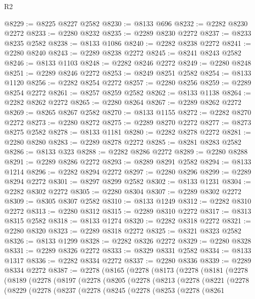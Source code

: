 \begin{lexlean}{R2}
\begin{coremodule}
@8229 := @8225 @8227 @2582
@8230 := @8133 @696
@8232 := @2282 @8230 @2272
@8233 := @2280 @8232
@8235 := @2289 @8230 @2272
@8237 := @8233 @8235 @2582
@8238 := @8133 @1086
@8240 := @2282 @8238 @2272
@8241 := @2280 @8240
@8243 := @2289 @8238 @2272
@8245 := @8241 @8243 @2582
@8246 := @8133 @1103
@8248 := @2282 @8246 @2272
@8249 := @2280 @8248
@8251 := @2289 @8246 @2272
@8253 := @8249 @8251 @2582
@8254 := @8133 @1120
@8256 := @2282 @8254 @2272
@8257 := @2280 @8256
@8259 := @2289 @8254 @2272
@8261 := @8257 @8259 @2582
@8262 := @8133 @1138
@8264 := @2282 @8262 @2272
@8265 := @2280 @8264
@8267 := @2289 @8262 @2272
@8269 := @8265 @8267 @2582
@8270 := @8133 @1155
@8272 := @2282 @8270 @2272
@8273 := @2280 @8272
@8275 := @2289 @8270 @2272
@8277 := @8273 @8275 @2582
@8278 := @8133 @1181
@8280 := @2282 @8278 @2272
@8281 := @2280 @8280
@8283 := @2289 @8278 @2272
@8285 := @8281 @8283 @2582
@8286 := @8133 @323
@8288 := @2282 @8286 @2272
@8289 := @2280 @8288
@8291 := @2289 @8286 @2272
@8293 := @8289 @8291 @2582
@8294 := @8133 @1214
@8296 := @2282 @8294 @2272
@8297 := @2280 @8296
@8299 := @2289 @8294 @2272
@8301 := @8297 @8299 @2582
@8302 := @8133 @1231
@8304 := @2282 @8302 @2272
@8305 := @2280 @8304
@8307 := @2289 @8302 @2272
@8309 := @8305 @8307 @2582
@8310 := @8133 @1249
@8312 := @2282 @8310 @2272
@8313 := @2280 @8312
@8315 := @2289 @8310 @2272
@8317 := @8313 @8315 @2582
@8318 := @8133 @1274
@8320 := @2282 @8318 @2272
@8321 := @2280 @8320
@8323 := @2289 @8318 @2272
@8325 := @8321 @8323 @2582
@8326 := @8133 @1299
@8328 := @2282 @8326 @2272
@8329 := @2280 @8328
@8331 := @2289 @8326 @2272
@8333 := @8329 @8331 @2582
@8334 := @8133 @1317
@8336 := @2282 @8334 @2272
@8337 := @2280 @8336
@8339 := @2289 @8334 @2272
@8387 := @2278
    (@8165
      (@2278
        (@8173
          (@2278
            (@8181
              (@2278
                (@8189
                  (@2278
                    (@8197
                      (@2278
                        (@8205
                          (@2278
                            (@8213
                              (@2278
                                (@8221
                                  (@2278
                                    (@8229
                                      (@2278
                                        (@8237
                                          (@2278
                                            (@8245
                                              (@2278
                                                (@8253
                                                  (@2278
                                                    (@8261

\end{coremodule}
\end{lexlean}
